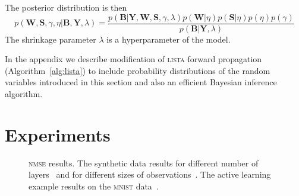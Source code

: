 \documentclass{article}
\begin{document}
  The posterior distribution is then
  \begin{equation}
  \label{eq:posterior}
  p(\mathbf{W}, \mathbf{S}, \gamma, \eta | \mathbf{B}, \mathbf{Y}, \lambda)
  = \frac{p(\mathbf{B} | \mathbf{Y}, \mathbf{W},  \mathbf{S}, \gamma, \lambda) p(\mathbf{W} | \eta )p(\mathbf{S} | \eta) p(\eta) p(\gamma)}{p(\mathbf{B} | \mathbf{Y}, \lambda)}
  \end{equation}
  The shrinkage parameter $\lambda$ is a hyperparameter of the model.
  
In the appendix we describe modification of \textsc{lista} forward propagation (Algorithm~\ref{alg:lista}) to include probability distributions of the random variables introduced in this section and also an efficient Bayesian inference algorithm.
  
  \section{Experiments}
  \label{sec:experiments}

   \begin{figure}[!t]
  \centering
  \hfil
  \hfil
  \caption{\textsc{nmse} results. The synthetic data results for different number of layers~\protect{} and for different sizes of observations~\protect{}. The active learning example results on the \textsc{mnist} data~\protect{}.}
  \label{fig:number_of_layers_synthetic}
  \end{figure}  
  
\end{document}
